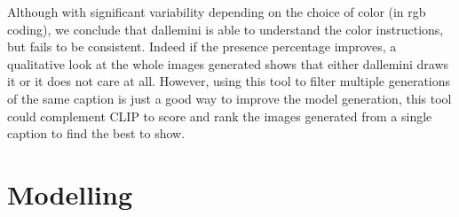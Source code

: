 \documentclass{article}
\begin{document}
\begin{multicols}{2}
Although with significant variability depending on the choice of color (in rgb coding), we conclude that \gls{dallemini} is able to understand the color instructions, but fails to be consistent. Indeed if the presence percentage improves, a qualitative look at the whole images generated shows that either \gls{dallemini} draws it or it does not care at all. However, using this tool to filter multiple generations of the same caption is just a good way to improve the model generation, this tool could complement CLIP to score and rank the images generated from a single caption to find the best to show.

\end{multicols}

\section{Modelling}
\end{document}
